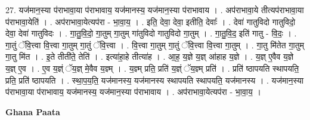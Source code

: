 \documentclass[17pt]{extarticle}
\begin{document}
27. यज॑मान॒स्या प॑राभावा॒या प॑राभावाय॒ यज॑मानस्य॒ यज॑मान॒स्या प॑राभावाय । . अप॑राभावा॒ये तीत्यप॑राभावा॒या प॑राभावा॒येति॑ । . अप॑राभावा॒येत्यप॑रा - भा॒वा॒य॒ । . इति॒ देवा॒ देवा॒ इतीति॒ देवाः᳚ । . देवा॑ गातुविदो गातुविदो॒ देवा॒ देवा॑ गातुविदः । . गा॒तु॒वि॒दो॒ गा॒तुम् गा॒तुम् गा॑तुविदो गातुविदो गा॒तुम् । . गा॒तु॒वि॒द॒ इति॑ गातु - वि॒दः॒ । . गा॒तुं ॅवि॒त्त्वा वि॒त्त्वा गा॒तुम् गा॒तुं ॅवि॒त्त्वा । . वि॒त्त्वा गा॒तुम् गा॒तुं ॅवि॒त्त्वा वि॒त्त्वा गा॒तुम् । . गा॒तु मि॑तेत गा॒तुम् गा॒तु मि॑त । . इ॒ते तीती॑ते॒ तेति॑ । . इत्या॑हा॒हे तीत्या॑ह । . आ॒ह॒ य॒ज्ञे य॒ज्ञ् आ॑हाह य॒ज्ञे । . य॒ज्ञ् ए॒वैव य॒ज्ञे य॒ज्ञ् ए॒व । . ए॒व य॒ज्ञ्ं ॅय॒ज्ञ् मे॒वैव य॒ज्ञ्म् । . य॒ज्ञ्म् प्रति॒ प्रति॑ य॒ज्ञ्ं ॅय॒ज्ञ्म् प्रति॑ । . प्रति॑ ष्ठापयति स्थापयति॒ प्रति॒ प्रति॑ ष्ठापयति । . स्था॒प॒य॒ति॒ यज॑मानस्य॒ यज॑मानस्य स्थापयति स्थापयति॒ यज॑मानस्य । . यज॑मान॒स्या प॑राभावा॒या प॑राभावाय॒ यज॑मानस्य॒ यज॑मान॒स्या प॑राभावाय । . अप॑राभावा॒येत्यप॑रा - भा॒वा॒य॒ । \newline

\textbf{Ghana Paata } \newline
\end{document}
